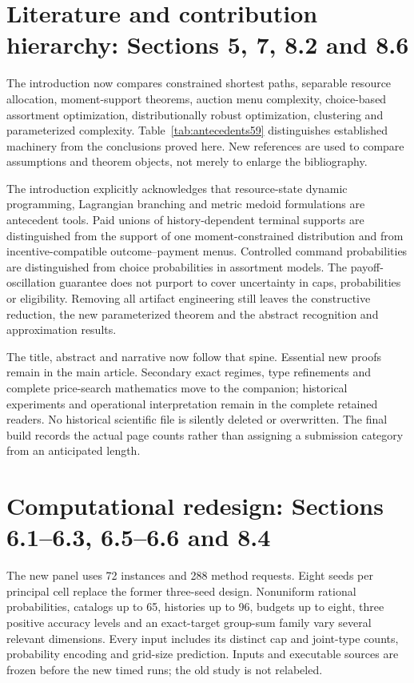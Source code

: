 \section{Literature and contribution hierarchy: Sections 5, 7, 8.2 and 8.6}
The introduction now compares constrained shortest paths, separable resource allocation, moment-support theorems, auction menu complexity, choice-based assortment optimization, distributionally robust optimization, clustering and parameterized complexity. Table~\ref{tab:antecedents59} distinguishes established machinery from the conclusions proved here. New references are used to compare assumptions and theorem objects, not merely to enlarge the bibliography.

The introduction explicitly acknowledges that resource-state dynamic programming, Lagrangian branching and metric medoid formulations are antecedent tools. Paid unions of history-dependent terminal supports are distinguished from the support of one moment-constrained distribution and from incentive-compatible outcome--payment menus. Controlled command probabilities are distinguished from choice probabilities in assortment models. The payoff-oscillation guarantee does not purport to cover uncertainty in caps, probabilities or eligibility. Removing all artifact engineering still leaves the constructive reduction, the new parameterized theorem and the abstract recognition and approximation results.

The title, abstract and narrative now follow that spine. Essential new proofs remain in the main article. Secondary exact regimes, type refinements and complete price-search mathematics move to the companion; historical experiments and operational interpretation remain in the complete retained readers. No historical scientific file is silently deleted or overwritten. The final build records the actual page counts rather than assigning a submission category from an anticipated length.

\section{Computational redesign: Sections 6.1--6.3, 6.5--6.6 and 8.4}
The new panel uses 72 instances and 288 method requests. Eight seeds per principal cell replace the former three-seed design. Nonuniform rational probabilities, catalogs up to 65, histories up to 96, budgets up to eight, three positive accuracy levels and an exact-target group-sum family vary several relevant dimensions. Every input includes its distinct cap and joint-type counts, probability encoding and grid-size prediction. Inputs and executable sources are frozen before the new timed runs; the old study is not relabeled.

